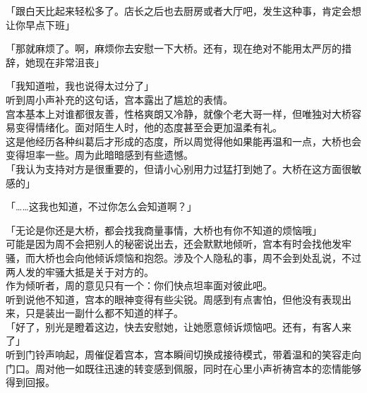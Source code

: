 「跟白天比起来轻松多了。店长之后也去厨房或者大厅吧，发生这种事，肯定会想让你早点下班」

「那就麻烦了。啊，麻烦你去安慰一下大桥。还有，现在绝对不能用太严厉的措辞，她现在非常沮丧」

「我知道啦，我也说得太过分了」\\

听到周小声补充的这句话，宫本露出了尴尬的表情。\\

宫本基本上对谁都很友善，性格爽朗又冷静，就像个老大哥一样，但唯独对大桥容易变得情绪化。面对陌生人时，他的态度甚至会更加温柔有礼。\\

这是他经历各种纠葛后才形成的态度，所以周觉得他如果能再温和一点，大桥也会变得坦率一些。周为此暗暗感到有些遗憾。\\

「我认为支持对方是很重要的，但请小心别用力过猛打到她了。大桥在这方面很敏感的」

「……这我也知道，不过你怎么会知道啊？」

「无论是你还是大桥，都会找我商量事情，大桥也有你不知道的烦恼哦」\\

可能是因为周不会把别人的秘密说出去，还会默默地倾听，宫本有时会找他发牢骚，而大桥也会向他倾诉烦恼和抱怨。涉及个人隐私的事，周不会到处乱说，不过两人发的牢骚大抵是关于对方的。\\

作为倾听者，周的意见只有一个：你们快点坦率面对彼此吧。\\

听到说他不知道，宫本的眼神变得有些尖锐。周感到有点害怕，但他没有表现出来，只是装出一副什么都不知道的样子。\\

「好了，别光是瞪着这边，快去安慰她，让她愿意倾诉烦恼吧。还有，有客人来了」\\

听到门铃声响起，周催促着宫本，宫本瞬间切换成接待模式，带着温和的笑容走向门口。周对他一如既往迅速的转变感到佩服，同时在心里小声祈祷宫本的恋情能够得到回报。
